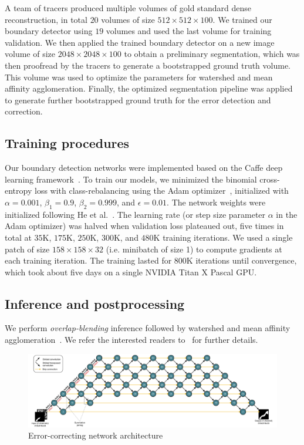 \documentclass{article}
\begin{document}
A team of tracers produced multiple volumes of gold standard dense reconstruction, in total $20$ volumes of size $512 \times 512 \times 100$. We trained our boundary detector using $19$ volumes and used the last volume for training validation. We then applied the trained boundary detector on a new image volume of size $2048 \times 2048 \times 100$ to obtain a preliminary segmentation, which was then proofread by the tracers to generate a bootstrapped ground truth volume. This volume was used to optimize the parameters for watershed and mean affinity agglomeration. Finally, the optimized segmentation pipeline was applied to generate further bootstrapped ground truth for the error detection and correction.

\subsection{Training procedures}
Our boundary detection networks were implemented based on the Caffe deep
learning framework~\cite{jia2014caffe}. To train our models, we minimized the
binomial cross-entropy loss with class-rebalancing using the Adam
optimizer~\cite{adam}, initialized with $\alpha=0.001$, $\beta_1=0.9$,
$\beta_2=0.999$, and $\epsilon=0.01$. The network weights were initialized
following He et al.~\cite{he2015delving}. The learning rate (or step size
parameter $\alpha$ in the Adam optimizer) was halved when validation loss
plateaued out, five times in total at $35$K, $175$K, $250$K, $300$K, and
$480$K training iterations. We used a single patch of size
$158\times158\times32$ (i.e. minibatch of size 1) to compute gradients at each
training iteration. The training lasted for $800$K iterations until convergence,
which took about five days on a single NVIDIA Titan X Pascal GPU.

\subsection{Inference and postprocessing}
We perform \emph{overlap-blending} inference followed by watershed and mean affinity agglomeration~\cite{kisuk}. We refer the interested readers to~\cite{kisuk} for further details.

\label{appendix:architecture}
\begin{figure}
\centering
\includegraphics[width=1.0\linewidth]{corrector.pdf}
\caption{Error-correcting network architecture}
\end{figure}
\end{document}
